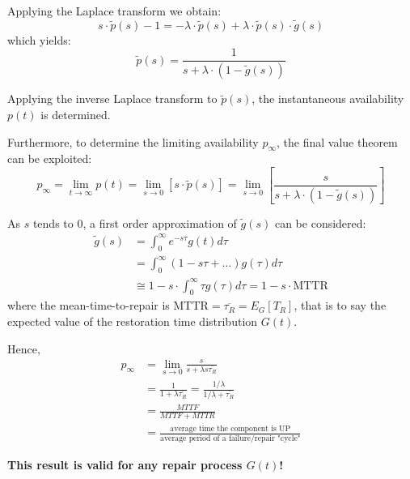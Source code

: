 Applying the Laplace transform we obtain:
\begin{equation*}
    s\cdot \tilde{p}(s) - 1 = -\lambda\cdot \tilde{p}(s) + \lambda\cdot\tilde{p}(s)\cdot\tilde{g}(s)
\end{equation*}
which yields:
\begin{equation*}
    \tilde{p}(s) = \frac{1}{s+\lambda\cdot(1-\tilde{g}(s))}
\end{equation*}

Applying the inverse Laplace transform to $\tilde{p}(s)$, the instantaneous
availability $p(t)$ is determined.

Furthermore, to determine the limiting availability $p_\infty$, the final value
theorem can be exploited:
\begin{equation*}
    p_\infty = \lim_{t\to\infty}p(t) = \lim_{s\to 0} [s\cdot\tilde{p}(s)] = \lim_{s\to 0}\left[\frac{s}{s+\lambda\cdot(1-\tilde{g}(s))}\right]
\end{equation*}

As $s$ tends to 0, a first order approximation of $\tilde{g}(s)$ can be
considered:
\begin{equation*}
    \begin{split}
        \tilde{g}(s) &= \int_0^\infty e^{-s\tau} g(t) d\tau \\
        &= \int_0^\infty (1-s\tau + \dots)g(\tau)d\tau \\
        &\cong 1-s\cdot\int_0^\infty \tau g(\tau)d\tau = 1-s\cdot\text{MTTR}
    \end{split}
\end{equation*}
where the mean-time-to-repair is $\text{MTTR} = \overline{\tau_R} = E_G[T_R]$,
that is to say the expected value of the restoration time distribution $G(t)$.

Hence,
\begin{equation*}
    \begin{split}
        p_\infty &= \lim_{s\to 0} \frac{s}{s+\lambda s \overline{\tau_R}} \\
        &= \frac{1}{1+\lambda\overline{\tau_R}} = \frac{1/\lambda}{1/\lambda+\overline{\tau_R}} \\
        &= \frac{MTTF}{MTTF+MTTR} \\
        &= \frac{\text{average time the component is UP}}{\text{average period of a failure/repair "cycle"}}
    \end{split}
\end{equation*}

\textbf{This result is valid for any repair process $G(t)$!}

